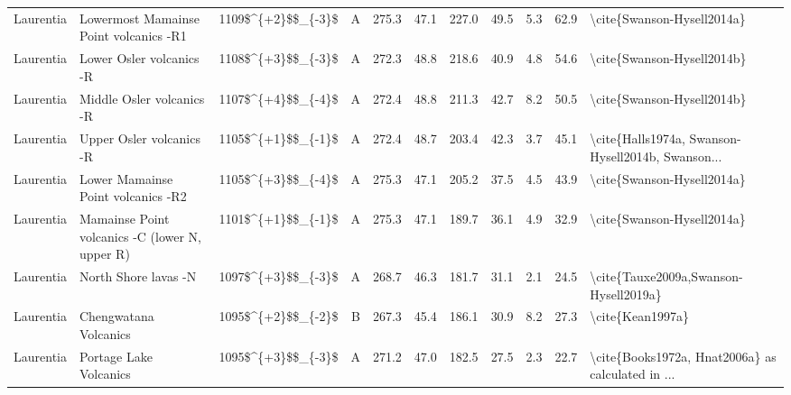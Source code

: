 \begin{longtable}{p{1 in}p{1 in}rrrrrrrr}
                     Laurentia &           Lowermost Mamainse Point volcanics -R1 &     1109\$\textasciicircum \{+2\}\$\$\_\{-3\}\$ &      A &     275.3 &      47.1 & 227.0 &  49.5 &       5.3 &        62.9 &                         \textbackslash cite\{Swanson-Hysell2014a\} \\
                     Laurentia &                         Lower Osler volcanics -R &     1108\$\textasciicircum \{+3\}\$\$\_\{-3\}\$ &      A &     272.3 &      48.8 & 218.6 &  40.9 &       4.8 &        54.6 &                         \textbackslash cite\{Swanson-Hysell2014b\} \\
                     Laurentia &                        Middle Osler volcanics -R &     1107\$\textasciicircum \{+4\}\$\$\_\{-4\}\$ &      A &     272.4 &      48.8 & 211.3 &  42.7 &       8.2 &        50.5 &                         \textbackslash cite\{Swanson-Hysell2014b\} \\
                     Laurentia &                         Upper Osler volcanics -R &     1105\$\textasciicircum \{+1\}\$\$\_\{-1\}\$ &      A &     272.4 &      48.7 & 203.4 &  42.3 &       3.7 &        45.1 &  \textbackslash cite\{Halls1974a, Swanson-Hysell2014b, Swanson... \\
                     Laurentia &               Lower Mamainse Point volcanics -R2 &     1105\$\textasciicircum \{+3\}\$\$\_\{-4\}\$ &      A &     275.3 &      47.1 & 205.2 &  37.5 &       4.5 &        43.9 &                         \textbackslash cite\{Swanson-Hysell2014a\} \\
                     Laurentia &   Mamainse Point volcanics -C (lower N, upper R) &     1101\$\textasciicircum \{+1\}\$\$\_\{-1\}\$ &      A &     275.3 &      47.1 & 189.7 &  36.1 &       4.9 &        32.9 &                         \textbackslash cite\{Swanson-Hysell2014a\} \\
                     Laurentia &                             North Shore lavas -N &     1097\$\textasciicircum \{+3\}\$\$\_\{-3\}\$ &      A &     268.7 &      46.3 & 181.7 &  31.1 &       2.1 &        24.5 &              \textbackslash cite\{Tauxe2009a,Swanson-Hysell2019a\} \\
                     Laurentia &                            Chengwatana Volcanics &     1095\$\textasciicircum \{+2\}\$\$\_\{-2\}\$ &      B &     267.3 &      45.4 & 186.1 &  30.9 &       8.2 &        27.3 &                                   \textbackslash cite\{Kean1997a\} \\
                     Laurentia &                           Portage Lake Volcanics &     1095\$\textasciicircum \{+3\}\$\$\_\{-3\}\$ &      A &     271.2 &      47.0 & 182.5 &  27.5 &       2.3 &        22.7 &  \textbackslash cite\{Books1972a, Hnat2006a\} as calculated in ... \\

\end{longtable}
